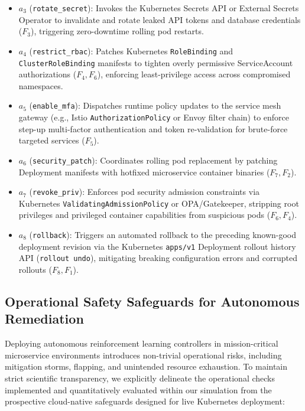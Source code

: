 \documentclass[ASNA,twocolumn]{USG}
\begin{document}
\begin{enumerate}
\begin{itemize}
        \item $a_3$ (\texttt{rotate\_secret}): Invokes the Kubernetes Secrets API or External Secrets Operator to invalidate and rotate leaked API tokens and database credentials ($F_3$), triggering zero-downtime rolling pod restarts.
        \item $a_4$ (\texttt{restrict\_rbac}): Patches Kubernetes \texttt{RoleBinding} and \texttt{ClusterRoleBinding} manifests to tighten overly permissive ServiceAccount authorizations ($F_4, F_6$), enforcing least-privilege access across compromised namespaces.
        \item $a_5$ (\texttt{enable\_mfa}): Dispatches runtime policy updates to the service mesh gateway (e.g., Istio \texttt{AuthorizationPolicy} or Envoy filter chain) to enforce step-up multi-factor authentication and token re-validation for brute-force targeted services ($F_5$).
        \item $a_6$ (\texttt{security\_patch}): Coordinates rolling pod replacement by patching Deployment manifests with hotfixed microservice container binaries ($F_7, F_2$).
        \item $a_7$ (\texttt{revoke\_priv}): Enforces pod security admission constraints via Kubernetes \texttt{ValidatingAdmissionPolicy} or OPA/Gatekeeper, stripping root privileges and privileged container capabilities from suspicious pods ($F_6, F_4$).
        \item $a_8$ (\texttt{rollback}): Triggers an automated rollback to the preceding known-good deployment revision via the Kubernetes \texttt{apps/v1} Deployment rollout history API (\texttt{rollout undo}), mitigating breaking configuration errors and corrupted rollouts ($F_8, F_1$).
    \end{itemize}
\end{enumerate}

\subsection{Operational Safety Safeguards for Autonomous Remediation}
Deploying autonomous reinforcement learning controllers in mission-critical microservice environments introduces non-trivial operational risks, including mitigation storms, flapping, and unintended resource exhaustion. To maintain strict scientific transparency, we explicitly delineate the operational checks implemented and quantitatively evaluated within our simulation from the prospective cloud-native safeguards designed for live Kubernetes deployment:
\end{document}
